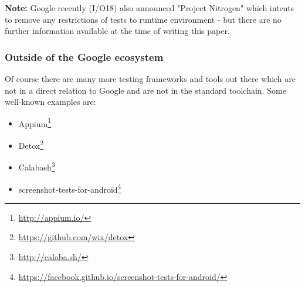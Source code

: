 \begin{mdframed}[style=InfoBox,align=center]
	\textbf{Note:} Google recently (I/O18) also announced "Project Nitrogen" which intents to remove any restrictions of tests to runtime environment - but there are no further information available at the time of writing this paper.
\end{mdframed}

\subsubsection{Outside of the Google ecosystem}

Of course there are many more testing frameworks and tools out there which are not in a direct relation to Google and are not in the standard toolchain. Some well-known examples are:

\begin{itemize}
	\item Appium\footnote{\url{http://appium.io/}}
	\item Detox\footnote{\url{https://github.com/wix/detox}}
	\item Calabash\footnote{\url{http://calaba.sh/}}
	\item screenshot-tests-for-android\footnote{\url{https://facebook.github.io/screenshot-tests-for-android/}}
\end{itemize}




